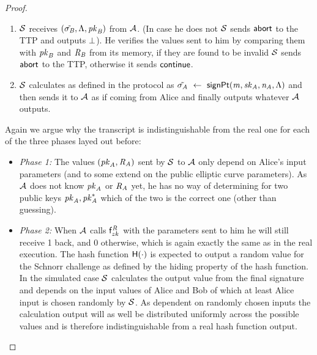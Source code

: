 \begin{proof}
\begin{enumerate}
        \item $\mathcal{S}$ receives $(\tilde{\sigma_{\mathit{B}}}, \Lambda, \mathit{pk}_{\mathit{B}})$ from $\mathcal{A}$.
        (In case he does not $\mathcal{S}$ sends $\mathsf{abort}$ to the TTP and outputs $\bot$).
        He verifies the values sent to him by comparing them with $\mathit{pk}_{\mathit{B}}$ and $\mathit{R}_{\mathit{B}}$ from its memory, if they are found to be invalid $\mathcal{S}$ sends $\mathsf{abort}$ to the TTP, otherwise it sends $\mathsf{continue}$.
        \item $\mathcal{S}$ calculates as defined in the protocol as $\tilde{\sigma_{\mathit{A}}} ~\leftarrow~ \mathsf{signPt}(\mathit{m}, \mathit{sk}_{\mathit{A}}, \mathit{\mathit{n}_{\mathit{A}}}, \Lambda)$ and then sends it to $\mathcal{A}$ as if coming from Alice and finally outputs whatever $\mathcal{A}$ outputs.
    \end{enumerate}
    Again we argue why the transcript is indistinguishable from the real one for each of the three phases layed out before:
    \begin{itemize}
        \item \textit{Phase 1: } The values $(\mathit{pk}_{\mathit{A}}, \mathit{R}_{\mathit{A}})$ sent by $\mathcal{S}$ to $\mathcal{A}$ only depend on Alice's input parameters (and to some extend on the public elliptic curve parameters).
        As $\mathcal{A}$ does not know $\mathit{pk}_{\mathit{A}}$ or $\mathit{R}_{\mathit{A}}$ yet, he has no way of determining for two public keys $\mathit{pk}_{\mathit{A}}, \mathit{pk}_{\mathit{A}}^*$ which of the two is the correct one (other than guessing).
        \item \textit{Phase 2: } When $\mathcal{A}$ calls $\mathsf{f}^{\mathit{R}}_{zk}$ with the parameters sent to him he will still receive 1 back, and 0 otherwise, which is again exactly the same as in the real execution.
        The hash function $\mathsf{H} (\cdot)$ is expected to output a random value for the Schnorr challenge as defined by the hiding property of the hash function. 
        In the simulated case $\mathcal{S}$ calculates the output value from the final signature and depends on the input values of Alice and Bob of which at least Alice input is chosen randomly by $\mathcal{S}$.
        As dependent on randomly chosen inputs the calculation output will as well be distributed uniformly across the possible values and is therefore indistinguishable from a real hash function output.

\end{itemize}
\end{proof}
